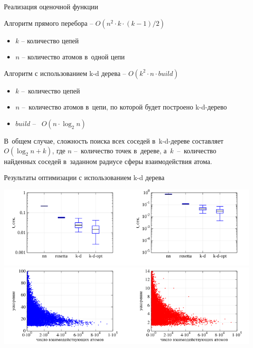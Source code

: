 \documentclass[sans,aspectratio=169]{beamer}
\begin{document}
\begin{frame}{Реализация оценочной функции}

	\fontsize{11}{12}\selectfont
	\hangindent=-0.5cm
	 \noindent
	\setlength{\leftmargini}{20pt}
	
	\vspace{-5pt}	
	Алгоритм прямого перебора -- $O(n^2{\cdot}k{\cdot}(k-1)/2)$
	
	\begin{itemize}
		\item $k$ -- количество цепей
		\item $n$ -- количество атомов в~одной цепи
	\end{itemize}		
	
	\vspace{4mm}	
	
	Алгоритм с использованием k-d дерева	-- $O(k^2 \cdot n \cdot build)$
	
	\begin{itemize}
		\item $k$ --~количество цепей
		\item $n$ --~количество атомов в~цепи, по которой будет построено k-d-дерево
		\item $build$ -- ~$O(n \cdot \log_{2}{n})$
	\end{itemize}
	
	\vspace{4mm}	
	
	В~общем случае, сложность поиска всех соседей в~k-d-дереве составляет $O(\log_{2}{n} + k)$, где $n$ --~количество точек в~дереве, а~$k$~--~количество найденных соседей в~заданном радиусе сферы взаимодействия атома.

\end{frame}



\begin{frame}{Результаты оптимизации с использованием k-d дерева}
	\fontsize{11}{12}\selectfont
	\hangindent=-0.5cm
	 \noindent
	\setlength{\leftmargini}{20pt}
	
	\centering
	\vspace{-3pt}
	\includegraphics[scale=0.9]{images/bxpt.pdf}
	\vspace{4mm}
	\includegraphics[scale=0.9]{images/accel.pdf}
	
\end{frame}
\end{document}
